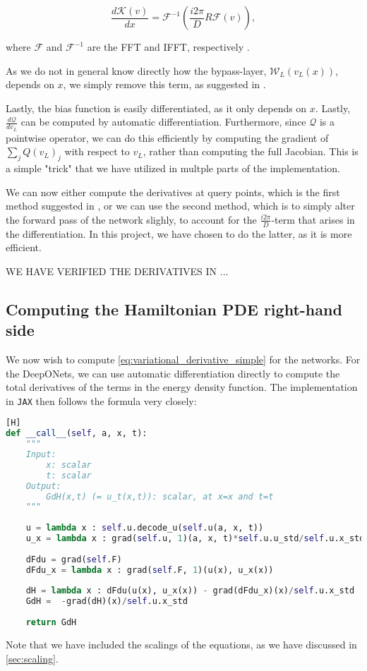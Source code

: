 \begin{equation}
    \frac{d \mathcal{K} (v)}{dx} = \mathcal{F}^{-1} \left( \frac{i 2 \pi }{D} R \mathcal{F} (v) \right),
\end{equation}

where \(\mathcal{F}\) and \(\mathcal{F}^{-1}\) are the FFT and IFFT, respectively . 

As we do not in general know directly how the bypass-layer, \(\mathcal{W}_L(v_L(x))\), depends on \(x\), we simply remove this term, as suggested in \cite{liPhysicsInformedNeuralOperator2023}.

Lastly, the bias function is easily differentiated, as it only depends on \(x\). Lastly, \(\frac{d \mathcal{Q}}{d v_L}\) can be computed by automatic differentiation. Furthermore, since \(\mathcal{Q}\) is a pointwise operator, we can do this efficiently by
computing the gradient of \(\sum_j Q(v_L)_j\) with respect to \(v_L\), rather than computing the full Jacobian. This is a simple "trick" that we have utilized in multple parts of the implementation.

We can now either compute the derivatives at query points, which is the first method suggested in \cite{liPhysicsInformedNeuralOperator2023}, or we can use the second method, which is to simply alter the forward pass of the network slighly, to account for the \(\frac{i 2 \pi }{D}\)-term that arises in the differentiation.
In this project, we have chosen to do the latter, as it is more efficient.

WE HAVE VERIFIED THE DERIVATIVES IN ...

\subsection{Computing the Hamiltonian PDE right-hand side}
We now wish to compute \cref{eq:variational_derivative_simple} for the networks. For the DeepONets, we can use automatic differentiation directly to compute the total derivatives of the terms in the energy density function.
The implementation in \texttt{JAX} then follows the formula very closely:

\begin{lstlisting}[language=Python, caption=Computing the Hamiltonian PDE right-hand side for the DeepONets][H]
def __call__(self, a, x, t):
    """
    Input:
        x: scalar
        t: scalar
    Output:
        GdH(x,t) (= u_t(x,t)): scalar, at x=x and t=t
    """
    
    u = lambda x : self.u.decode_u(self.u(a, x, t))
    u_x = lambda x : grad(self.u, 1)(a, x, t)*self.u.u_std/self.u.x_std
    
    dFdu = grad(self.F)
    dFdu_x = lambda x : grad(self.F, 1)(u(x), u_x(x))
    
    dH = lambda x : dFdu(u(x), u_x(x)) - grad(dFdu_x)(x)/self.u.x_std
    GdH =  -grad(dH)(x)/self.u.x_std
    
    return GdH
\end{lstlisting}
Note that we have included the scalings of the equations, as we have discussed in \cref{sec:scaling}.

